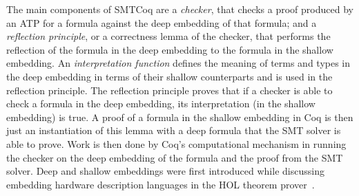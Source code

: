 \documentclass{article}
\begin{document}
	The main components of SMTCoq are 
	a \textit{checker}, that checks 
	a proof produced by an ATP for a 
	formula against the deep embedding 
	of that formula; and a 
	\textit{reflection principle}, 
	or a correctness lemma of the checker,
	that performs the reflection of the 
	formula	in the deep embedding to the 
	formula in the shallow embedding. 
	An \textit{interpretation function}
	defines the meaning of terms and types 
	in the deep embedding in terms of their
	shallow counterparts and is used in the 
	reflection principle. The reflection 
	principle 
	proves that if a checker is able to 
	check a formula in the deep embedding,
	its interpretation (in the shallow 
	embedding) is true. A proof of 
	a formula in the shallow embedding 
	in Coq is then just an instantiation 
	of this lemma with a deep formula that 
	the SMT solver is able to prove.
	Work is then done by Coq's 
	computational mechanism in running
	the checker on the deep embedding 
	of the formula and the proof 
	from the SMT solver. Deep and shallow 
	embeddings were first introduced 
	while discussing embedding 
	hardware description languages 
	in the HOL theorem 
	prover~\cite{10.5555/645902.672777}.
	
\end{document}
